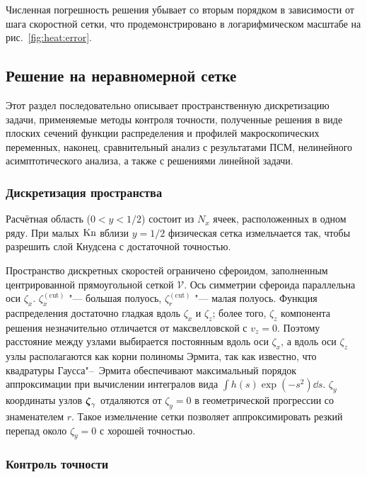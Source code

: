 Численная погрешность решения убывает со вторым порядком в зависимости от шага скоростной сетки,
что продемонстрировано в логарифмическом масштабе на рис.~\ref{fig:heat:error}.

\subsection{Решение на неравномерной сетке}

Этот раздел последовательно описывает пространственную дискретизацию задачи,
применяемые методы контроля точности, полученные решения в виде плоских сечений функции распределения
и профилей макроскопических переменных, наконец, сравнительный анализ с результатами ПСМ,
нелинейного асимптотического анализа, а также с решениями линейной задачи.

\subsubsection{Дискретизация пространства}

Расчётная область (\(0<y<1/2\)) состоит из \(N_x\) ячеек, расположенных в одном ряду.
При малых \(\mathrm{Kn}\) вблизи \(y=1/2\) физическая сетка измельчается так,
чтобы разрешить слой Кнудсена с достаточной точностью.

Пространство дискретных скоростей ограничено сфероидом, заполненным центрированной прямоугольной сеткой \(\mathcal{V}\).
Ось симметрии сфероида параллельна оси \(\zeta_x\).
\(\zeta^{(\mathrm{cut})}_x\) "--- большая полуось, \(\zeta^{(\mathrm{cut})}_r\) "--- малая полуось.
Функция распределения достаточно гладкая вдоль \(\zeta_x\) и \(\zeta_z\);
более того, \(\zeta_z\) компонента решения незначительно отличается от максвелловской с \(v_z=0\).
Поэтому расстояние между узлами выбирается постоянным вдоль оси \(\zeta_x\),
а вдоль оси \(\zeta_z\) узлы располагаются как корни полиномы Эрмита,
так как известно, что квадратуры Гаусса"--~Эрмита обеспечивают максимальный порядок аппроксимации
при вычислении интегралов вида \(\int h(s)\exp(-s^2)\dd{s}\).
\(\zeta_y\) координаты узлов \({\boldsymbol{\zeta}}_\gamma\) отдаляются от \(\zeta_y=0\)
в геометрической прогрессии со знаменателем \(r\).
Такое измельчение сетки позволяет аппроксимировать резкий перепад около \(\zeta_y=0\)
с хорошей точностью.

\subsubsection{Контроль точности}

